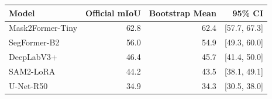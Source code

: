 \begin{tabular}{lrrr}
\toprule
Model & Official mIoU & Bootstrap Mean & 95\% CI \\
\midrule
Mask2Former-Tiny & 62.8 & 62.4 & [57.7, 67.3] \\
SegFormer-B2 & 56.0 & 54.9 & [49.3, 60.0] \\
DeepLabV3+ & 46.4 & 45.7 & [41.4, 50.0] \\
SAM2-LoRA & 44.2 & 43.5 & [38.1, 49.1] \\
U-Net-R50 & 34.9 & 34.3 & [30.5, 38.0] \\
\bottomrule
\end{tabular}
